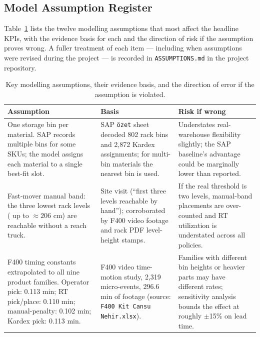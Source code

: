 \subsection{Model Assumption Register}\label{sec:app_assumptions}

Table~\ref{tab:assumptions} lists the twelve modelling assumptions that
most affect the headline KPIs, with the evidence basis for each and the
direction of risk if the assumption proves wrong.
A fuller treatment of each item --- including when assumptions were
revised during the project --- is recorded in \texttt{ASSUMPTIONS.md}
in the project repository.

\begin{table}[htbp]
  \centering
  \caption{Key modelling assumptions, their evidence basis, and the
    direction of error if the assumption is violated.}
  \label{tab:assumptions}
  \small
  \setlength{\tabcolsep}{4pt}
  \begin{tabular}{p{4.8cm} p{4.8cm} p{4.8cm}}
    \toprule
    \textbf{Assumption} & \textbf{Basis} & \textbf{Risk if wrong} \\
    \midrule
    One storage bin per material.  SAP records multiple bins for some
    SKUs; the model assigns each material to a single best-fit slot.
    &
    SAP \texttt{özet} sheet decoded 802 rack bins and 2,872 Kardex
    assignments; for multi-bin materials the nearest bin is used.
    &
    Understates real-warehouse flexibility slightly; the SAP baseline's
    advantage could be marginally lower than reported. \\[4pt]

    Fast-mover manual band: the three lowest rack levels (
    up to $\approx 206$ cm) are reachable without a reach truck.
    &
    Site visit (``first three levels reachable by hand''); corroborated
    by F400 video footage and rack PDF level-height stamps.
    &
    If the real threshold is two levels, manual-band placements are
    over-counted and RT utilization is understated across all policies. \\[4pt]

    F400 timing constants extrapolated to all nine product families.
    Operator pick: 0.113 min; RT pick/place: 0.110 min;
    manual-penalty: 0.102 min; Kardex pick: 0.113 min.
    &
    F400 video time-motion study, 2,319 micro-events, 296.6 min of footage
    (source: \texttt{F400 Kit Cansu Nehir.xlsx}).
    &
    Families with different bin heights or heavier parts may have
    different rates; sensitivity analysis bounds the effect at roughly
    $\pm$15\% on lead time. \\[4pt]


\end{tabular}
\end{table}

